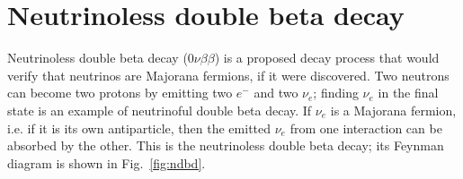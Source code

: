 \section{Neutrinoless double beta decay}

Neutrinoless double beta decay ($0\nu\beta\beta$) is a proposed decay
process that would verify that neutrinos are Majorana fermions, if
it were discovered. Two neutrons can become two protons by emitting
two $e^-$ and two $\nu_e$; finding $\nu_e$ in the final state is
an example of neutrinoful double beta decay. If $\nu_e$ is a
Majorana fermion, i.e. if it is its own antiparticle, then the
emitted $\nu_e$ from one interaction can be absorbed by the other.
This is the neutrinoless double beta decay; its Feynman diagram
is shown in Fig.~\ref{fig:ndbd}.



